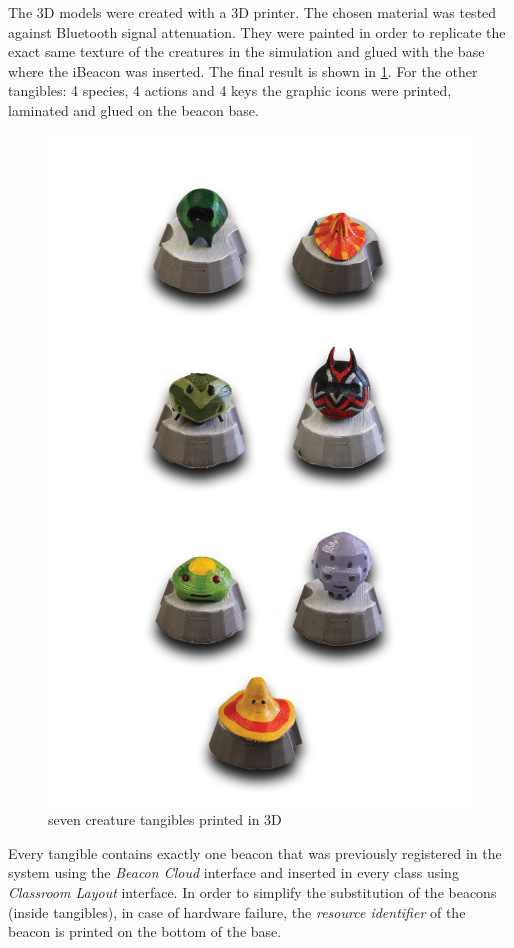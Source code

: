 The 3D models were created with a 3D printer. The chosen material was tested against Bluetooth signal attenuation. They were painted in order to replicate the exact same texture of the creatures in the simulation and glued with the base where the iBeacon was inserted. The final result is shown in \ref{fig:tangibles}. For the other tangibles: 4 species, 4 actions and 4 keys the graphic icons were printed, laminated and glued on the beacon base.

\begin{figure}
\centering
\includegraphics[width=5in]{images/tangibles.png}
\caption{seven creature tangibles printed in 3D}
\label{fig:tangibles}
\end{figure}

Every tangible contains exactly one beacon that was previously registered in the system using the \textit{Beacon Cloud} interface and inserted in every class using \textit{Classroom Layout} interface. In order to simplify the substitution of the beacons (inside tangibles), in case of hardware failure, the \textit{resource identifier} of the beacon is  printed on the bottom of the base.

